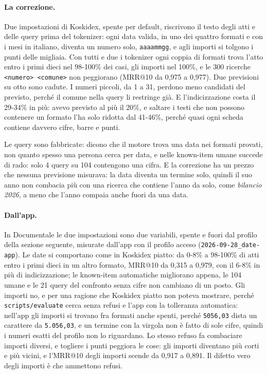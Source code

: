 \paragraph{La correzione.} Due impostazioni di Koskidex, spente per default,
riscrivono il testo degli atti e delle query prima del tokenizer: ogni data
valida, in uno dei quattro formati e con i mesi in italiano, diventa un numero
solo, \texttt{aaaammgg}, e agli importi si tolgono i punti delle migliaia. Con
tutti e due i tokenizer ogni coppia di formati trova l'atto entro i primi dieci
nel 98-100\% dei casi, gli importi nel 100\%, e le 300 ricerche
\texttt{<numero> <comune>} non peggiorano (MRR@10 da 0,975 a 0,977). Due
previsioni su otto sono cadute. I numeri piccoli, da 1 a 31, perdono meno
candidati del previsto, perché il comune nella query li restringe già. E
l'indicizzazione costa il 29-34\% in più: avevo previsto al più il 20\%, e
saltare i testi che non possono contenere un formato l'ha solo ridotta dal
41-46\%, perché quasi ogni scheda contiene davvero cifre, barre e punti.

Le query sono fabbricate: dicono che il motore trova una data nei formati
provati, non quanto spesso una persona cerca per data, e nelle known-item umane
succede di rado: solo 4 query su 104 contengono una cifra. E la correzione ha un prezzo che nessuna
previsione misurava: la data diventa un termine solo, quindi il suo anno non
combacia più con una ricerca che contiene l'anno da solo, come \emph{bilancio
2026}, a meno che l'anno compaia anche fuori da una data.

\paragraph{Dall'app.} In Documentale le due impostazioni sono due variabili,
spente e fuori dal profilo della sezione seguente, misurate dall'app con il
profilo acceso (\texttt{2026-09-28\_date-app}). Le date si comportano come in
Koskidex piatto: da 0-8\% a 98-100\% di atti entro i primi dieci in un altro
formato, MRR@10 da 0,315 a 0,979, con il 6-8\% in più di indicizzazione; le
known-item automatiche migliorano appena, le 104 umane e le 21 query del
confronto senza cifre non cambiano di un posto. Gli importi no, e
per una ragione che Koskidex piatto non poteva mostrare, perché
\texttt{scripts/evaluate} cerca senza refusi e l'app con la tolleranza
automatica: nell'app gli importi si trovano fra formati anche spenti,
perché \texttt{5056,03} dista un carattere da \texttt{5.056,03}, e un termine
con la virgola non è fatto di sole cifre, quindi i numeri esatti del
profilo non lo riguardano. Lo stesso refuso fa combaciare importi diversi, e
togliere i punti peggiora le cose: gli importi diventano più corti e più
vicini, e l'MRR@10 degli importi scende da 0,917 a 0,891. Il difetto vero
degli importi è che ammettono refusi.

